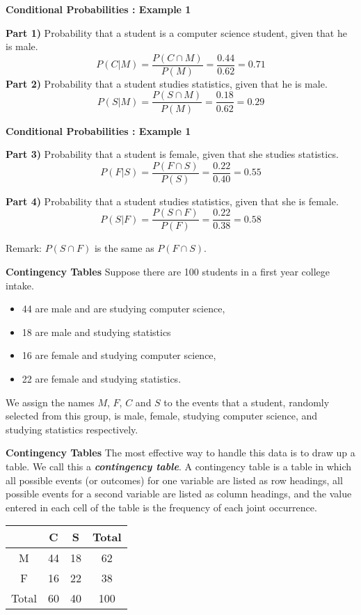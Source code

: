\noindent \textbf{Conditional Probabilities : Example 1}

\textbf{Part 1)} Probability that a student is a computer science student, given that he is male.
\[ P(C|M) = \frac{P(C \cap M)}{P(M)}  = \frac{0.44}{0.62} = 0.71 \]
\textbf{Part 2)} Probability that a student studies statistics, given that he is male.
\[ P(S|M) = \frac{P(S \cap M)}{P(M)}  = \frac{0.18}{0.62} = 0.29 \]


\noindent \textbf{Conditional Probabilities : Example 1}

\textbf{Part 3)} Probability that a student is female, given that she studies statistics.
\[ P(F|S) = \frac{P(F \cap S)}{P(S)}  = \frac{0.22}{0.40} = 0.55 \]

\textbf{Part 4)} Probability that a student studies statistics, given that she is female.
\[ P(S|F) = \frac{P(S \cap F)}{P(F)}  = \frac{0.22}{0.38} = 0.58 \]


Remark: $P(S \cap F)$ is the same as $P(F \cap S)$.






\newpage

\noindent \textbf{Contingency Tables}
	Suppose there are 100 students in a first year college intake.  \begin{itemize} \item 44 are male and are studying computer science, \item 18 are male and studying statistics \item 16 are female and studying computer science, \item 22 are female and studying statistics. \end{itemize}
	
	We assign the names $M$, $F$, $C$ and $S$ to the events that a student, randomly selected from this group, is male, female, studying computer science, and studying statistics respectively.
	
	\noindent \textbf{Contingency Tables}
	The most effective way to handle this data is to draw up a table. We call this a \textbf{\emph{contingency table}}.
	A contingency table is a table in which all possible events (or outcomes) for one variable are listed as
	row headings, all possible events for a second variable are listed as column headings, and the value entered in
	each cell of the table is the frequency of each joint occurrence.
	
	
	\begin{center}
		\begin{tabular}{|c|c|c|c|}
			\hline
			& C & S & Total \\ \hline
			M & 44 & 18 & 62 \\ \hline
			F & 16 & 22 & 38 \\ \hline
			Total & 60 & 40 & 100 \\ \hline
		\end{tabular}
	\end{center}



